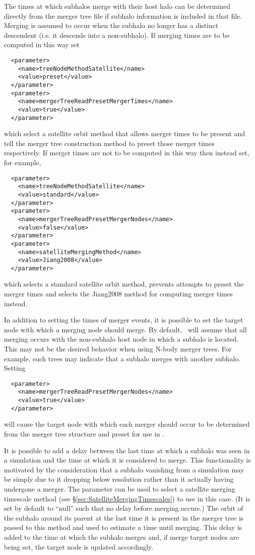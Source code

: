 The times at which subhalos merge with their host halo can be determined directly from the merger tree file if subhalo information is included in that file. Merging is assumed to occur when the subhalo no longer has a distinct descendent (i.e. it descends into a non-subhalo). If merging times are to be computed in this way set
\begin{verbatim}
  <parameter>
    <name>treeNodeMethodSatellite</name>
    <value>preset</value>    
  </parameter>
  <parameter>
    <name>mergerTreeReadPresetMergerTimes</name>
    <value>true</value>    
  </parameter>
\end{verbatim}
which select a satellite orbit method that allows merger times to be present and tell the merger tree construction method to preset those merger times respectively. If merger times are not to be computed in this way then instead set, for example,
\begin{verbatim}
  <parameter>
    <name>treeNodeMethodSatellite</name>
    <value>standard</value>    
  </parameter>
  <parameter>
    <name>mergerTreeReadPresetMergerNodes</name>
    <value>false</value>
  </parameter>
  <parameter>
    <name>satelliteMergingMethod</name>
    <value>Jiang2008</value>
  </parameter>
\end{verbatim}
which selects a standard satellite orbit method, prevents attempts to preset the merger times and selects the {\normalfont \ttfamily Jiang2008} method for computing merger times instead.

In addition to setting the times of merger events, it is possible to set the target node with which a merging node should merge. By default, \glc\ will assume that all merging occurs with the non-subhalo host node in which a subhalo is located. This may not be the desired behavior when using N-body merger trees. For example, such trees may indicate that a subhalo merges with another subhalo. Setting
\begin{verbatim}
  <parameter>
    <name>mergerTreeReadPresetMergerNodes</name>
    <value>true</value>
  </parameter>
\end{verbatim}
will cause the target node with which each merger should occur to be determined from the merger tree structure and preset for use in \glc.

It is possible to add a delay between the last time at which a subhalo was seen in a simulation and the time at which it is considered to merge. This functionality is motivated by the consideration that a subhalo vanishing from a simulation may be simply due to it dropping below resolution rather than it actually having undergone a merger. The parameter {\normalfont \ttfamily [mergerTreeReadSubresolutionMergingMethod]} can be used to select a satellite merging timescale method (see \S\ref{sec:SatelliteMergingTimescales}) to use in this case. (It is set by default to ``{\normalfont \ttfamily null}'' such that no delay before merging occurs.) The orbit of the subhalo around its parent at the last time it is present in the merger tree is passed to this method and used to estimate a time until merging. This delay is added to the time at which the subhalo merges and, if merge target nodes are being set, the target node is updated accordingly.


